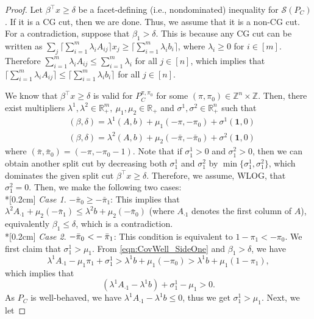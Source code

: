 \documentclass[11pt]{article}
\newcommand{\Z}{\mathbb{Z}}
\newcommand{\R}{\mathbb{R}}
\renewcommand{\S}{\mathcal{S}}
\newcommand{\ones}{\boldsymbol{1}}
\newcommand{\bpar}{\beta}
\newcommand{\cred}{\color{black}}
\begin{document}
\begin{proof}
Let $\bpar^\top x \geq \delta$ be a facet-defining (i.e., nondominated) inequality for $\S(P_C)$. If it is a CG cut, then we are done. Thus, we assume that it is a non-CG cut. For a contradiction, suppose that $\bpar_1 > \delta$. {\cred This is because any CG cut can be written as $\sum_j \lceil \sum_{i = 1}^m \lambda_i A_{ij} \rceil x_j \geq \lceil \sum_{i = 1}^m \lambda_i b_i \rceil$, where $\lambda_i \geq 0 $ for $i \in [m]$. Therefore $\sum_{i = 1}^m \lambda_i A_{ij} \leq \sum_{i = 1}^m \lambda_i $ for all $j \in [n]$, which implies that $\lceil \sum_{i = 1}^m \lambda_i A_{ij} \rceil \leq \lceil \sum_{i = 1}^m \lambda_i b_i \rceil$ for all $j \in [n]$.} 

We know that $\bpar^\top x \geq \delta$ is valid for $P_C^{\pi,\pi_0}$ for some $(\pi,\pi_0) \in \Z^n \times \Z$. Then, there exist multipliers $\lambda^1, \lambda^2 \in \R_+^m, \ \mu_1, \mu_2 \in \R_+$ and $\sigma^1, \sigma^2 \in \R_+^n$ such that
\begin{align}
\label{eqn:CovWell_SideOne}
& (\bpar,\delta) = \lambda^1 (A,b) + \mu_1 (-\pi,-\pi_0) + \sigma^1 (\ones,0) \\
\label{eqn:CovWell_SideTwo}
& (\bpar,\delta) = \lambda^2 (A,b) + \mu_2 (-\bar{\pi},-\bar{\pi}_0) + \sigma^2 (\ones,0)
\end{align}
where $(\bar{\pi},\bar{\pi}_0) = (-\pi,-\pi_0-1)$. Note that if $\sigma^1_1 > 0$ and $\sigma^2_1 > 0$, then we can obtain another split cut by decreasing both $\sigma^1_1$ and $\sigma^2_1$ by $\min \{ \sigma^1_1,\sigma^2_1\}$, which dominates the given split cut $\bpar^\top x \geq \delta$. Therefore, we assume, WLOG, that $\sigma^2_1 = 0$. Then, we make the following two cases: \\*[0.2cm]
\emph{Case 1}. $- \bar{\pi}_0 \geq - \bar{\pi}_1$: This implies that $\lambda^2 A_{\cdot 1} + \mu_2 (-\bar{\pi}_1) \leq \lambda^2 b + \mu_2 (-\bar{\pi}_0)$ (where $A_{\cdot 1}$ denotes the first column of $A$), equivalently $\bpar_1 \leq \delta$, which is a contradiction.
\\*[0.2cm]
\emph{Case 2}. $- \bar{\pi}_0 \ {\cred <} - \bar{\pi}_1$: This condition is equivalent to $1-\pi_1 < -\pi_0$. We first claim that $\sigma^1_1 > \mu_1$. From \eqref{eqn:CovWell_SideOne} and $\bpar_1 > \delta$, we have 
$$\lambda^1 A_{\cdot 1} - \mu_1 \pi_1 + \sigma^1_1 > \lambda^1 b + \mu_1 (-\pi_0) >  \lambda^1 b + \mu_1 (1-\pi_1),$$
which implies that 
$$(\lambda^1 A_{\cdot 1}-\lambda^1 b) + \sigma^1_1 - \mu_1 > 0.$$
As $P_C$ is well-behaved, we have $\lambda^1 A_{\cdot 1}-\lambda^1 b \leq 0$, thus we get $\sigma^1_1 > \mu_1$. Next, we let 

\end{proof}
\end{document}
